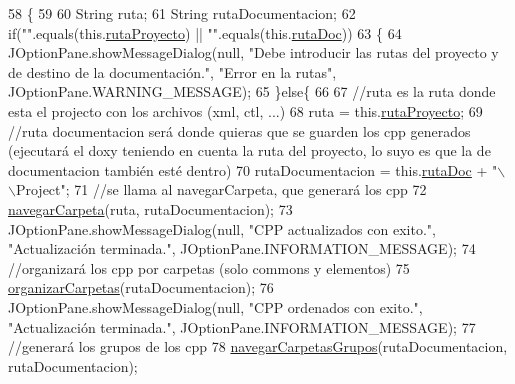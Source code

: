 \begin{DoxyCode}
58                            \{
59         
60         String ruta;
61         String rutaDocumentacion;
62         \textcolor{keywordflow}{if}(\textcolor{stringliteral}{""}.equals(this.\mbox{\hyperlink{classactualizadordoxy_1_1_actualizador_doxy_a6e5d8e5e0fe3f2392d1c426bea2fb7fa}{rutaProyecto}}) || \textcolor{stringliteral}{""}.equals(this.\mbox{\hyperlink{classactualizadordoxy_1_1_actualizador_doxy_a5655cc699bfc4a0b01432170892663d8}{rutaDoc}}))
63         \{
64             JOptionPane.showMessageDialog(null, \textcolor{stringliteral}{"Debe introducir las rutas del proyecto y de destino de la
       documentación."}, \textcolor{stringliteral}{"Error en la rutas"}, JOptionPane.WARNING\_MESSAGE);
65         \}\textcolor{keywordflow}{else}\{
66             
67             \textcolor{comment}{//ruta es la ruta donde esta el projecto con los archivos (xml, ctl, ...)}
68             ruta = this.\mbox{\hyperlink{classactualizadordoxy_1_1_actualizador_doxy_a6e5d8e5e0fe3f2392d1c426bea2fb7fa}{rutaProyecto}};
69             \textcolor{comment}{//ruta documentacion será donde quieras que se guarden los cpp generados (ejecutará el doxy
       teniendo en cuenta la ruta del proyecto, lo suyo es que la de documentacion también esté dentro)}
70             rutaDocumentacion = this.\mbox{\hyperlink{classactualizadordoxy_1_1_actualizador_doxy_a5655cc699bfc4a0b01432170892663d8}{rutaDoc}} + \textcolor{stringliteral}{"\(\backslash\)\(\backslash\)Project"};
71             \textcolor{comment}{//se llama al navegarCarpeta, que generará los cpp}
72             \mbox{\hyperlink{classactualizadordoxy_1_1_actualizador_doxy_af4668210418bc7f9f1d6b8786891678b}{navegarCarpeta}}(ruta, rutaDocumentacion);
73             JOptionPane.showMessageDialog(null, \textcolor{stringliteral}{"CPP actualizados con exito."}, \textcolor{stringliteral}{"Actualización terminada."}, 
      JOptionPane.INFORMATION\_MESSAGE);
74             \textcolor{comment}{//organizará los cpp por carpetas (solo commons y elementos)}
75             \mbox{\hyperlink{classactualizadordoxy_1_1_actualizador_doxy_ada45f34eba1b90fde37a09726ff2de59}{organizarCarpetas}}(rutaDocumentacion);
76             JOptionPane.showMessageDialog(null, \textcolor{stringliteral}{"CPP ordenados con exito."}, \textcolor{stringliteral}{"Actualización terminada."}, 
      JOptionPane.INFORMATION\_MESSAGE);
77             \textcolor{comment}{//generará los grupos de los cpp}
78             \mbox{\hyperlink{classactualizadordoxy_1_1_actualizador_doxy_a483f64d7ea713784694962feed55f4f4}{navegarCarpetasGrupos}}(rutaDocumentacion, rutaDocumentacion);

\end{DoxyCode}
